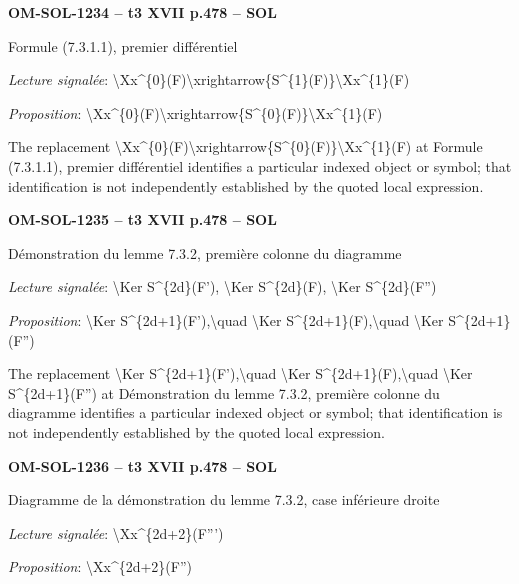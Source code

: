 \par\noindent\textbf{OM-SOL-1234 -- t3 XVII p.478 -- SOL}\par
Formule (7.3.1.1), premier différentiel\par
\emph{Lecture signalée}: \textbackslash{}Xx\textasciicircum{}\{0\}(F)\textbackslash{}xrightarrow\{S\textasciicircum{}\{1\}(F)\}\textbackslash{}Xx\textasciicircum{}\{1\}(F)\par
\emph{Proposition}: \textbackslash{}Xx\textasciicircum{}\{0\}(F)\textbackslash{}xrightarrow\{S\textasciicircum{}\{0\}(F)\}\textbackslash{}Xx\textasciicircum{}\{1\}(F)\par
The replacement \textbackslash{}Xx\textasciicircum{}\{0\}(F)\textbackslash{}xrightarrow\{S\textasciicircum{}\{0\}(F)\}\textbackslash{}Xx\textasciicircum{}\{1\}(F) at Formule (7.3.1.1), premier différentiel identifies a particular indexed object or symbol; that identification is not independently established by the quoted local expression.\par
\par\noindent\textbf{OM-SOL-1235 -- t3 XVII p.478 -- SOL}\par
Démonstration du lemme 7.3.2, première colonne du diagramme\par
\emph{Lecture signalée}: \textbackslash{}Ker S\textasciicircum{}\{2d\}(F'), \textbackslash{}Ker S\textasciicircum{}\{2d\}(F), \textbackslash{}Ker S\textasciicircum{}\{2d\}(F'')\par
\emph{Proposition}: \textbackslash{}Ker S\textasciicircum{}\{2d+1\}(F'),\textbackslash{}quad \textbackslash{}Ker S\textasciicircum{}\{2d+1\}(F),\textbackslash{}quad \textbackslash{}Ker S\textasciicircum{}\{2d+1\}(F'')\par
The replacement \textbackslash{}Ker S\textasciicircum{}\{2d+1\}(F'),\textbackslash{}quad \textbackslash{}Ker S\textasciicircum{}\{2d+1\}(F),\textbackslash{}quad \textbackslash{}Ker S\textasciicircum{}\{2d+1\}(F'') at Démonstration du lemme 7.3.2, première colonne du diagramme identifies a particular indexed object or symbol; that identification is not independently established by the quoted local expression.\par
\par\noindent\textbf{OM-SOL-1236 -- t3 XVII p.478 -- SOL}\par
Diagramme de la démonstration du lemme 7.3.2, case inférieure droite\par
\emph{Lecture signalée}: \textbackslash{}Xx\textasciicircum{}\{2d+2\}(F''')\par
\emph{Proposition}: \textbackslash{}Xx\textasciicircum{}\{2d+2\}(F'')\par
